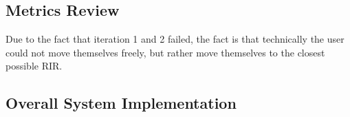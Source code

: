 \documentclass[../../main.tex]{subfiles}
\begin{document}










		\subsection{Metrics Review}

		Due to the fact that iteration 1 and 2 failed, the fact is that technically the user could not move themselves freely, but rather move themselves to the closest possible \ac{RIR}.

		\subsection{Overall System Implementation}
\end{document}
